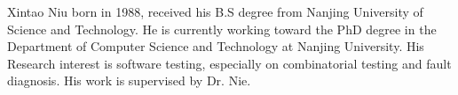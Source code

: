 \documentclass[10pt,journal,cspaper,compsoc]{IEEEtran}
\begin{document}
\ifCLASSOPTIONcaptionsoff
  \newpage
\fi








%
%
%

%

\begin{IEEEbiography}{Xintao Niu}
born in 1988, received his B.S degree from Nanjing University of Science and Technology. He is currently
working toward the PhD degree in the Department of Computer Science and Technology at
Nanjing University. His Research interest is software testing, especially on combinatorial testing and fault diagnosis. His work is supervised by Dr. Nie.
\end{IEEEbiography}
\end{document}
